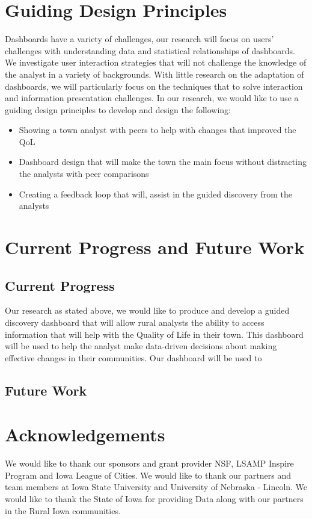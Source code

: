 \documentclass[10pt]{article}
\begin{document}
\section{Guiding Design Principles}
Dashboards have a variety of challenges, our research will focus on users' challenges with understanding data and statistical relationships of dashboards. We investigate user interaction strategies that will not challenge the knowledge of the analyst in a variety of backgrounds. With little research on the adaptation of dashboards, we will particularly focus on the techniques that to solve interaction and information presentation challenges. In our research, we would like to use a guiding design principles to develop and design the following:
\begin{itemize}
\item Showing a town analyst with peers to help with changes that improved the QoL
\item Dashboard design that will make the town the main focus without distracting the analysts with peer comparisons
\item Creating a feedback loop that will, assist in the guided discovery from the analysts
\end{itemize}


\section{Current Progress and Future Work}

\subsection{Current Progress}
Our research as stated above, we would like to produce and develop a guided discovery dashboard that will allow rural analysts the ability to access information that will help with the Quality of Life in their town. This dashboard will be used to help the analyst make data-driven decisions about making effective changes in their communities. Our dashboard will be used to 
\subsection{Future Work}

\section{Acknowledgements}
We would like to thank our sponsors and grant provider NSF, LSAMP Inspire Program and Iowa League of Cities. We would like to thank our partners and team members at Iowa State University and University of Nebraska - Lincoln. We would like to thank the State of Iowa for providing Data along with our partners in the Rural Iowa communities.



\end{document}
